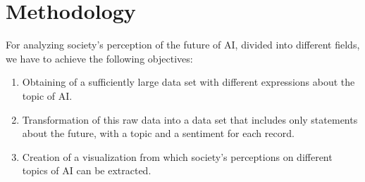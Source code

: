 \section{Methodology}

For analyzing society's perception of the future of AI, divided into different fields, we have to achieve the following objectives:
\begin{enumerate}
    \item Obtaining of a sufficiently large data set with different expressions about the topic of AI.
    \item Transformation of this raw data into a data set that includes only statements about the future, with a topic and a sentiment for each record.
    \item Creation of a visualization from which society's perceptions on different topics of AI can be extracted.
\end{enumerate}

